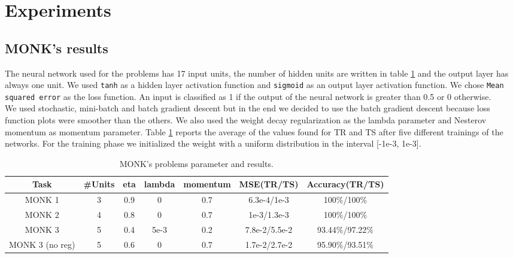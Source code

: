 \section{Experiments}


\subsection{MONK's results}

The neural network used for the problems has 17 input units, the number of hidden units are written in table \ref{tab:dati}  and the output layer has always one unit. We used \texttt{tanh} as a hidden layer activation function and \texttt{sigmoid} as an output layer activation function. We chose \texttt{Mean squared error} as the loss function. An input is classified as 1 if the output of the neural network is greater than 0.5 or 0 otherwise.\\
We used stochastic, mini-batch and batch gradient descent but in the end we decided to use the batch gradient descent because loss function plots were smoother than the others.
We also used the weight decay regularization as the lambda parameter and Nesterov momentum as momentum parameter. Table \ref{tab:dati} reports the average of the values found for TR and TS after five different trainings of the networks. For the training phase we initialized the weight with a uniform distribution in the interval [-1e-3, 1e-3].    
\begin{center}
\small\addtolength{\tabcolsep}{-5pt}
\begin{table}[H]
\begin{tabular}{|c|c|c|c|c|c|c|}
\hline
\textbf{Task} &	\textbf{\#Units} &\textbf{ eta} & \textbf{lambda} &\textbf{momentum} & {\textbf{MSE(TR/TS)}} &\textbf{Accuracy(TR/TS)} \\ \hline
MONK 1        &    3 & 0.9 & 0 & 0.7  &   6.3e-4/1e-3 &   100\%/100\%  \\ \hline
MONK 2        &    4 & 0.8 & 0 & 0.7  &   1e-3/1.3e-3 &   100\%/100\% \\ \hline               
MONK 3        &    5 & 0.4 &5e-3 &0.2&     7.8e-2/5.5e-2&    93.44\%/97.22\%  \\ \hline
MONK 3 (no reg)&   5 & 0.6 &   0 &  0.7 &   1.7e-2/2.7e-2 & 95.90\%/93.51\%		\\ \hline              
\end{tabular}
\caption{MONK's problems parameter and results.}
\label{tab:dati}
\end{table}
\end{center}
